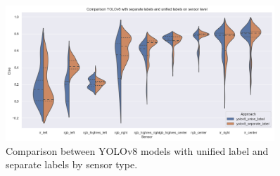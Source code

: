 \documentclass[Master,MDS,english]{BASE/twbook} %
\begin{document}
\begin{figure}[h]
\centering
\includegraphics[width=0.9\textwidth]{images/results/violin_plot_yolo}
\caption{Comparison between YOLOv8 models with unified label and separate labels by sensor type. }
\label{fig:yolo_vs_yolo}
\end{figure}
\end{document}
